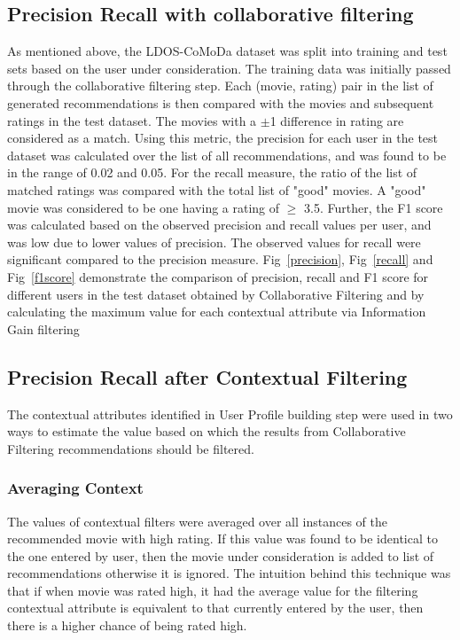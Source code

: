 \documentclass{article}
\begin{document}
\subsection{Precision Recall with collaborative filtering}
 As mentioned above, the LDOS-CoMoDa dataset was split into training and test sets based on the user under consideration. The training data was initially passed through the collaborative filtering step. Each (movie, rating) pair in the list of generated recommendations is then compared with the movies and subsequent ratings in the test dataset. The movies with a $\pm$1 difference in rating are considered as a match. Using this metric, the precision for each user in the test dataset was calculated over the list of all recommendations, and was found to be in the range of 0.02 and 0.05. For the recall measure, the ratio of the list of matched ratings was compared with the total list of "good" movies. A "good" movie was considered to be one having a rating of $\ge$ 3.5. Further, the F1 score was calculated based on the observed precision and recall values per user, and was low due to lower values of precision. The observed values for recall were significant compared to the precision measure. Fig~\ref{precision}, Fig~\ref{recall} and Fig~\ref{f1score} demonstrate the comparison of precision, recall and F1 score for different users in the test dataset obtained by Collaborative Filtering and by calculating the maximum value for each contextual attribute via Information Gain filtering
 
\subsection{Precision Recall after Contextual Filtering}

The contextual attributes identified in User Profile building step were used in two ways to estimate the value based on which the results from Collaborative Filtering recommendations should be filtered. 

\subsubsection{Averaging Context}

The values of contextual filters were averaged over all instances of the recommended movie with high rating. If this value was found to be identical to the one entered by user, then the movie under consideration is added to list of recommendations otherwise it is ignored. The intuition behind this technique was that if when movie was rated high, it had the average value for the filtering contextual attribute is equivalent to that currently entered by the user, then there is a higher chance of being rated high.\\
\end{document}
